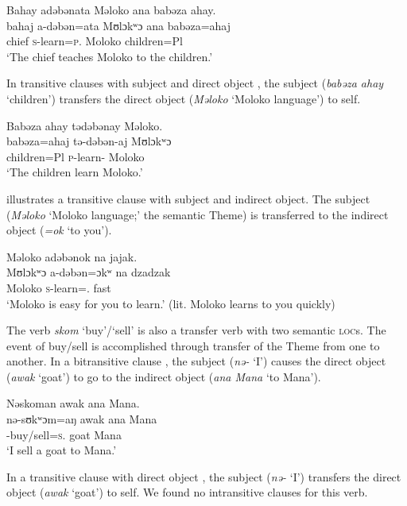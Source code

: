 \ea \label{ex:9:37}
Bahay  adəbənata  Məloko  ana  babəza  ahay. \\
\gll  bahaj a-dəbən=ata   Mʊlɔkʷɔ    ana   babəza=ahaj \\
      chief  \textsc{s}-learn=\textsc{p}.{\IO}  Moloko    {\DAT} children=Pl\\
\glt  ‘The chief teaches Moloko to the children.’ 
\z

In transitive clauses with subject and direct object , the subject (\textit{babəza ahay} ‘children’) transfers the direct object (\textit{Məloko} ‘Moloko language’) to self. 

\ea \label{ex:9:38}
Babəza  ahay  tədəbənay  Məloko.\\
\gll  babəza=ahaj   tə-dəbən-aj   Mʊlɔkʷɔ\\
      children=Pl  \textsc{p}-learn{}-{\CL}  Moloko \\
\glt  ‘The children learn Moloko.’ 
\z

 illustrates a transitive clause with subject and indirect object.  The subject (\textit{Məloko} ‘Moloko language;’ the semantic Theme) is transferred to the indirect object (\textit{=ok}  ‘to you’).  

\ea \label{ex:9:39}
Məloko  adəbənok  na  jajak.\\
\gll  Mʊlɔkʷɔ  a-dəbən=ɔkʷ  na  dzadzak\\
      Moloko  \textsc{s}-learn={\twoS}.{\IO}  \textsc{{\PSP}}  fast\\
\glt  ‘Moloko is easy for you to learn.’ (lit. Moloko learns to you quickly)
\z

The verb \textit{skom} ‘buy’/‘sell’ is also a transfer verb with two semantic {\scshape loc}s. The event of buy/sell is accomplished through transfer of the Theme from one \LOC to another. In a bitransitive clause , the subject (\textit{nə-}  ‘I’) causes the direct object (\textit{awak} ‘goat’) to go to the indirect object (\textit{ana Mana} ‘to Mana’). 

\ea \label{ex:9:40}
Nəskoman  awak  ana  Mana.\\
\gll  nə-sʊkʷɔm=aŋ     awak   ana   Mana\\
      {\oneS}-buy/sell=\textsc{s}.{\IO}    goat  {\DAT} Mana\\
\glt   ‘I sell a goat to Mana.’ 
\z

In a transitive clause with direct object , the subject (\textit{nə-} ‘I’) transfers the direct object (\textit{awak} ‘goat’) to self. We found no intransitive clauses for this verb.


